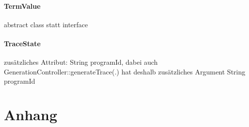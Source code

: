 \documentclass[parskip=full]{scrartcl}
\begin{document}
\paragraph{TermValue}abstract class statt interface \\
\paragraph{TraceState} zusätzliches Attribut: String programId, dabei auch GenerationController::generateTrace(.) hat deshalb zusätzliches Argument String programId
\section{Anhang}
\end{document}
